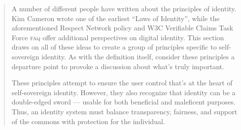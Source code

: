 \documentclass[twoside]{article}
\begin{document}
\begin{quote}
  A number of different people have written about the principles of identity. Kim Cameron wrote one of the earliest ``Laws of Identity'', while the aforementioned Respect Network policy and W3C Verifiable Claims Task Force \textsc{faq} offer additional perspectives on digital identity. This section draws on all of these ideas to create a group of principles specific to self-sovereign identity. As with the definition itself, consider these principles a departure point to provoke a discussion about what’s truly important.

  These principles attempt to ensure the user control that’s at the heart of self-sovereign identity. However, they also recognize that identity can be a double-edged sword — usable for both beneficial and maleficent purposes. Thus, an identity system must balance transparency, fairness, and support of the commons with protection for the individual.
\end{quote}
\end{document}
